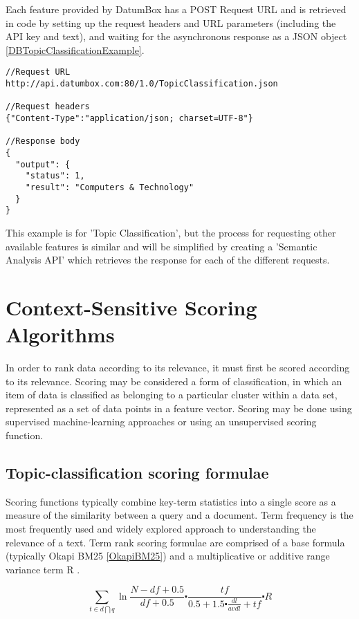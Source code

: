 Each feature provided by DatumBox has a POST Request URL and is retrieved in code by setting up the request headers and URL parameters (including the API key and text), and waiting for the asynchronous response as a JSON object \ref{DBTopicClassificationExample}.

\lstset{language=Java, caption=DatumBox Topic Classification example, label=DBTopicClassificationExample}
\begin{lstlisting}
//Request URL
http://api.datumbox.com:80/1.0/TopicClassification.json

//Request headers
{"Content-Type":"application/json; charset=UTF-8"}

//Response body
{
  "output": {
    "status": 1,
    "result": "Computers & Technology"
  }
}
\end{lstlisting}
This example is for 'Topic Classification', but the process for requesting other available features is similar and will be simplified by creating a 'Semantic Analysis API' which retrieves the response for each of the different requests. 

\section{Context-Sensitive Scoring Algorithms}

In order to rank data according to its relevance, it must first be scored according to its relevance. Scoring may be considered a form of classification, in which an item of data is classified as belonging to a particular cluster within a data set, represented as a set of data points in a feature vector. Scoring may be done using supervised machine-learning approaches or using an unsupervised scoring function. 

\subsection{Topic-classification scoring formulae}

Scoring functions typically combine key-term statistics into a single score as a measure of the similarity between a query and a document.
Term frequency is the most frequently used and widely explored approach to understanding the relevance of a text. Term rank scoring formulae are comprised of a base formula (typically Okapi BM25 \ref{OkapiBM25}) and a multiplicative or additive range variance term R \cite{OkapiBM25Paper}.

\begin{equation}\label{OkapiBM25}
	\sum\limits_{t\in d \bigcap q} \ln{\frac{N-df+0.5}{df+0.5}}\centerdot \frac{tf}{0.5+1.5 \centerdot \frac{dl}{avdl}+tf} \centerdot R
\end{equation}

